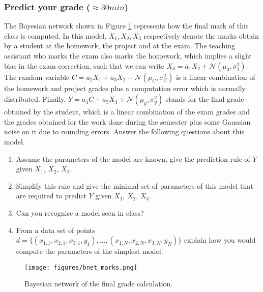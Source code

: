 \documentclass[a4paper, 10pt]{article}
\begin{document}
\subsubsection{Predict your grade ($\approx 30 min$)}
The Bayesian network shown in Figure \ref{fig:bnet_marks} represents how the final mark of this class is computed. In this model, $X_1, X_2, X_3$ respectively denote the marks obtain by a student at the homework, the project and at the exam. The teaching assistant who marks the exam also marks the homework, which implies a slight bias in the exam correction, such that we can write $X_3 = a_1X_2 + \mathcal{N}(\mu_3, \sigma_3^2)$. The random variable $C = a_2X_1 + a_3X_2 + \mathcal{N}(\mu_C, \sigma_C^2)$ is a linear combination of the homework and project grades plus a computation error which is normally distributed. Finally, $Y = a_4C + a_5 X_3 + \mathcal{N}(\mu_y, \sigma_y^2)$ stands for the final grade obtained by the student, which is a linear combination of the exam grades and the grades obtained for the work done during the semester plus some Gaussian noise on it due to rounding errors.
Answer the following questions about this model.
\begin{enumerate}
    \item Assume the parameters of the model are known, give the prediction rule of $Y$ given $X_1$, $X_2$, $X_3$.
    \item Simplify this rule and give the minimal set of parameters of this model that are required to predict $Y$ given $X_1$, $X_2$, $X_3$.
    \item Can you recognise a model seen in class?
    \item From a data set of points $d = \{(x_{1, 1}, x_{2, 1}, x_{3, 1}, y_1), \hdots, (x_{1, N}, x_{2, N}, x_{3, N}, y_N)\}$ explain how you would compute the parameters of the simplest model.
\end{enumerate}
\begin{figure}[H]
    \centering
    \texttt{[image: figures/bnet\_marks.png]}
    \caption{Bayesian network of the final grade calculation.}
    \label{fig:bnet_marks}
\end{figure}
\end{document}
